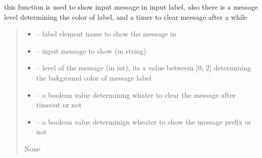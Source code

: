 \documentclass[letterpaper,10pt,english]{sphinxmanual}
\begin{document}
\begin{savenotes}
\begin{fulllineitems}
\begin{savenotes}\begin{fulllineitems}
\label{\detokenize{setting/login_UI:oxin.login_UI.UI_main_window.set_login_message}}
\pysigstartsignatures
{}
\pysigstopsignatures
\sphinxAtStartPar
this function is used to show input message in input label, also there is a message level determining the color of label, and a timer to clear meesage after a while
\begin{quote}\begin{description}
\begin{itemize}
\item {} 
\sphinxAtStartPar
{} – label element name to show the message in

\item {} 
\sphinxAtStartPar
{} – input message to show (in string)

\item {} 
\sphinxAtStartPar
{} – level of the message (in int), its a value betweem {[}0, 2{]} determining the bakground color of message label

\item {} 
\sphinxAtStartPar
{} – a boolean value determining whater to clear the message after timeout or not

\item {} 
\sphinxAtStartPar
{} – a boolean value determinign wheater to show the message prefix or not

\end{itemize}

\sphinxAtStartPar
None

\end{description}\end{quote}

\end{fulllineitems}\end{savenotes}


\end{fulllineitems}
\end{savenotes}
\end{document}
